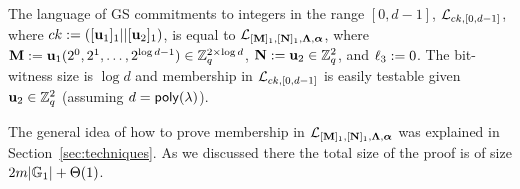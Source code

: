 \begin{example}
The language of GS commitments to integers in the range $[0,d-1]$, $\mathcal{L}_{ck,[0,d-1]}$, where $ck:=([\mathbf{u}_1]_1||[\mathbf{u}_2]_1)$, is equal to $\mathcal{L}_{[\mathbf{{M}}]_1,[\mathbf{{N}}]_1,\mathbf{{\Lambda}},{\boldsymbol \alpha}}$, where
$\mathbf{{M}}:=\mathbf{u}_1(2^0,2^1,\ldots,2^{\log d-1})\in\mathbb{Z}_q^{2\times \log d}$, $\mathbf{{N}}:=\mathbf{u}_2\in\mathbb{Z}_q^{2}$, and ${\ell_3}:=0$. The bit-witness size is $\log d$ and membership in $\mathcal{L}_{ck,[0,d-1]}$ is easily testable given $\mathbf{u}_2 \in \mathbb{Z}_q^2$
(assuming $d=\mathsf{poly}(\lambda)$). 
\end{example}

The general idea of how to prove membership in $\mathcal{L}_{[\mathbf{{M}}]_1,[\mathbf{{N}}]_1,\mathbf{{\Lambda}},{\boldsymbol \alpha}}$ was explained in Section~\ref{sec:techniques}. As we discussed there the total size of the proof is of size $2{m}|\mathbb{G}_1|+\Theta(1)$.
